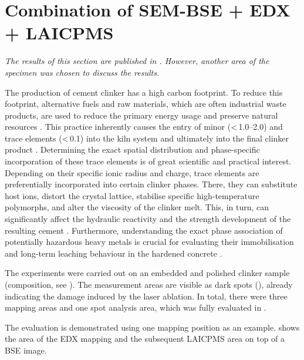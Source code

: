 \newpage
\section{Combination of \acs*{SEM}-\acs*{BSE} + \acs*{EDX} + \acs*{LAICPMS}}
\label{sec:corr_laicpms}

\textit{The results of this section are published in \cite{kleiner.2022b}. However, another area of the specimen was chosen to discuss the results.}

The production of cement clinker has a high carbon footprint.
To reduce this footprint, alternative fuels and raw materials, which are often industrial waste products, are used to reduce the primary energy usage and preserve natural resources \cite{schneider.2015}.
This practice inherently causes the entry of minor (<\,\qtyrange{1.0}{2.0}{\wtpercent}) and trace elements (<\,\qty{0.1}{\wtpercent}) into the kiln system and ultimately into the final clinker product \cite{stephan.1999,barros.2004,thiery.2025}.
Determining the exact spatial distribution and phase-specific incorporation of these trace elements is of great scientific and practical interest.
Depending on their specific ionic radius and charge, trace elements are preferentially incorporated into certain clinker phases.
There, they can substitute host ions, distort the crystal lattice, stabilise specific high-temperature polymorphs, and alter the viscosity of the clinker melt.
This, in turn, can significantly affect the hydraulic reactivity and the strength development of the resulting cement \cite{stephan.1999, barros.2004, stephan.2006, ludwig.2015}.
Furthermore, understanding the exact phase association of potentially hazardous heavy metals is crucial for evaluating their immobilisation and long-term leaching behaviour in the hardened concrete \cite{achternbosch.2003, kolovos.2002}.

The experiments were carried out on an embedded and polished clinker sample (composition, see ).
The measurement areas are visible as dark spots (), already indicating the damage induced by the laser ablation.
In total, there were three mapping areas and one spot analysis area, which was fully evaluated in \cite{kleiner.2022b}.

The evaluation is demonstrated using one mapping position as an example.
 shows the area of the \ac{EDX} mapping and the subsequent \ac{LAICPMS} area on top of a \ac{BSE} image.

